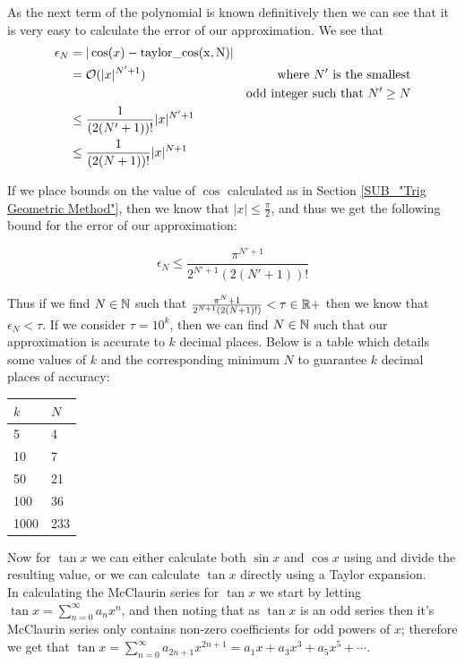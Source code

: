 {As the next term of the polynomial is known definitively then we can see that it is very easy to calculate the error of our approximation. We see that 
\begin{displaymath}
\begin{align*}
	\epsilon_N &= |\cos(x) - \mathrm{taylor\_cos(x,N)}|\\
		&= \mathcal{O}(|x|^{N'+1}) &\textrm{where } N' \textrm{ is the smallest}\\
		&&\textrm{odd integer such that } N'\ge N\\
		&\le \frac{1}{(2(N'+1))!} |x|^{N'+1}\\
		&\le \frac{1}{(2(N+1))!} |x|^{N+1}
\end{align*}
\end{displaymath}

If we place bounds on the value of \(\cos\) calculated as in Section \ref{SUB_"Trig Geometric Method"}, then we know that \(|x| \le \frac{\pi}{2}\), and thus we get the following bound for the error of our approximation:

\[\epsilon_N \le \frac{\pi^{N' + 1}}{2^{N'+1}(2(N'+1))!}\]

Thus if we find \(N \in \mathbb{N}\) such that \(\frac{\pi^{N}+1}{2^{N+1}(2(N+1)!)} < \tau \in \mathbb{R}+\) then we know that \(\epsilon_N < \tau\). If we consider \(\tau = 10^k\), then we can find \(N \in \mathbb{N}\) such that our approximation is accurate to \(k\) decimal places. Below is a table which details some values of \(k\) and the corresponding minimum \(N\) to guarantee \(k\) decimal places of accuracy:

\begin{center}
\begin{tabular}{|p{3cm}|p{3cm}|}
	\hline
	\(k\) & \(N\)\\
	\hline
	5 & 4\\\hline
	10 & 7\\\hline
	50 & 21\\\hline
	100 & 36\\\hline
	1000 & 233\\\hline
\end{tabular}
\end{center}

Now for \(\tan x\) we can either calculate both \(\sin x\) and \(\cos x\) using  and divide the resulting value, or we can calculate \(\tan x\) directly using a Taylor expansion.\\

In calculating the McClaurin series for \(\tan x\) we start by letting \(\tan x = \sum_{n=0}^\infty a_nx^n\), and then noting that as \(\tan x\) is an odd series then it's McClaurin series only contains non-zero coefficients for odd powers of \(x\); therefore we get that \(\tan x = \sum_{n=0}^\infty a_{2n+1}x^{2n+1} = a_1x + a_3x^3 + a_5x^5 + \cdots\).\\

}
